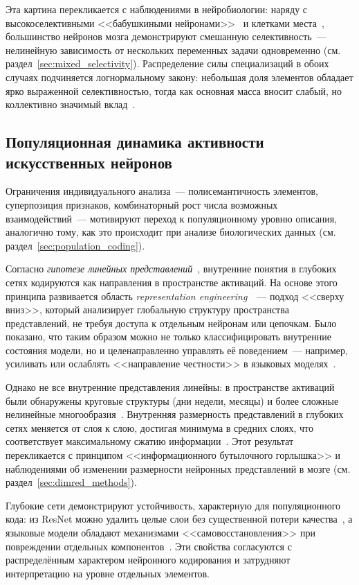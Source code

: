 Эта картина перекликается с наблюдениями в нейробиологии: наряду с высокоселективными <<бабушкиными нейронами>>~\cite{concepts} и клетками места~\cite{o1971hippocampus}, большинство нейронов мозга демонстрируют смешанную селективность~--- нелинейную зависимость от нескольких переменных задачи одновременно (см. раздел~\ref{sec:mixed_selectivity}). Распределение силы специализаций в обоих случаях подчиняется логнормальному закону: небольшая доля элементов обладает ярко выраженной селективностью, тогда как основная масса вносит слабый, но коллективно значимый вклад~\cite{Buzsaki2014}.

\subsection{Популяционная динамика активности искусственных нейронов}\label{sec:ann_population}

Ограничения индивидуального анализа~--- полисемантичность элементов, суперпозиция признаков, комбинаторный рост числа возможных взаимодействий~--- мотивируют переход к популяционному уровню описания, аналогично тому, как это происходит при анализе биологических данных (см. раздел~\ref{sec:population_coding}).

Согласно \textit{гипотезе линейных представлений}~\cite{Park2023LRH}, внутренние понятия в глубоких сетях кодируются как направления в пространстве активаций. На основе этого принципа развивается область \textit{representation engineering}~\cite{Zou2023RepE}~--- подход <<сверху вниз>>, который анализирует глобальную структуру пространства представлений, не требуя доступа к отдельным нейронам или цепочкам. Было показано, что таким образом можно не только классифицировать внутренние состояния модели, но и целенаправленно управлять её поведением~--- например, усиливать или ослаблять <<направление честности>> в языковых моделях~\cite{Zou2023RepE}.

Однако не все внутренние представления линейны: в пространстве активаций были обнаружены круговые структуры (дни недели, месяцы) и более сложные нелинейные многообразия~\cite{Engels2024nonlinear}. Внутренняя размерность представлений в глубоких сетях меняется от слоя к слою, достигая минимума в средних слоях, что соответствует максимальному сжатию информации~\cite{Ansuini2019}. Этот результат перекликается с принципом <<информационного бутылочного горлышка>> и наблюдениями об изменении размерности нейронных представлений в мозге (см. раздел~\ref{sec:dimred_methods}).

Глубокие сети демонстрируют устойчивость, характерную для популяционного кода: из ResNet можно удалить целые слои без существенной потери качества~\cite{Veit2016residual}, а языковые модели обладают механизмами <<самовосстановления>> при повреждении отдельных компонентов~\cite{McGrath2023hydra}. Эти свойства согласуются с распределённым характером нейронного кодирования и затрудняют интерпретацию на уровне отдельных элементов.

